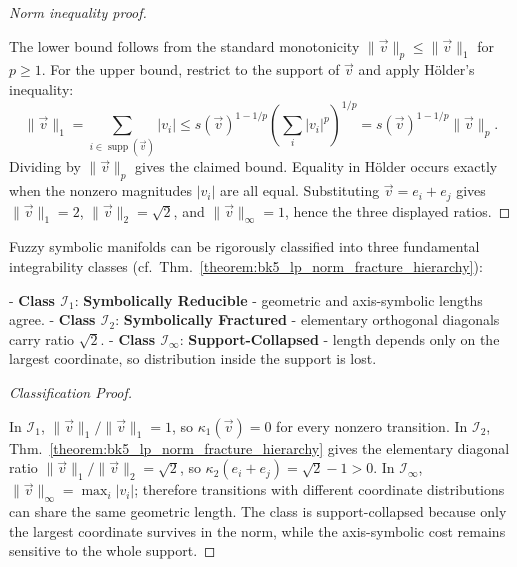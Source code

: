 \begin{proof}[Norm inequality proof]
\label{proof:bk5_lp_norm_fracture_hierarchy}
\leavevmode

The lower bound follows from the standard monotonicity
$\|\vec{v}\|_p\leq\|\vec{v}\|_1$ for $p\geq1$.  For the upper bound, restrict
to the support of $\vec{v}$ and apply Hölder's inequality:
\[
\|\vec{v}\|_1
=\sum_{i\in\operatorname{supp}(\vec{v})}|v_i|
\leq s(\vec{v})^{1-1/p}\left(\sum_i |v_i|^p\right)^{1/p}
=s(\vec{v})^{1-1/p}\|\vec{v}\|_p.
\]
Dividing by $\|\vec{v}\|_p$ gives the claimed bound.  Equality in Hölder
occurs exactly when the nonzero magnitudes $|v_i|$ are all equal.  Substituting
$\vec{v}=e_i+e_j$ gives $\|\vec{v}\|_1=2$, $\|\vec{v}\|_2=\sqrt{2}$, and
$\|\vec{v}\|_\infty=1$, hence the three displayed ratios.
\end{proof}

\begin{proposition}
\label{proposition:bk5_symbolic_integrability_classes}
Fuzzy symbolic manifolds can be rigorously classified into three fundamental integrability classes (cf.~Thm.~\ref{theorem:bk5_lp_norm_fracture_hierarchy}):

- \textbf{Class $\mathcal{I}_1$}: \textbf{Symbolically Reducible} - geometric and axis-symbolic lengths agree.
- \textbf{Class $\mathcal{I}_2$}: \textbf{Symbolically Fractured} - elementary orthogonal diagonals carry ratio $\sqrt{2}$.
- \textbf{Class $\mathcal{I}_\infty$}: \textbf{Support-Collapsed} - length depends only on the largest coordinate, so distribution inside the support is lost.
\end{proposition}

\begin{proof}[Classification Proof]
\label{proof:bk5_symbolic_integrability_classes}
\leavevmode

In $\mathcal{I}_1$, $\|\vec{v}\|_1/\|\vec{v}\|_1=1$, so
$\kappa_1(\vec{v})=0$ for every nonzero transition.  In $\mathcal{I}_2$,
Thm.~\ref{theorem:bk5_lp_norm_fracture_hierarchy} gives the elementary
diagonal ratio $\|\vec{v}\|_1/\|\vec{v}\|_2=\sqrt{2}$, so
$\kappa_2(e_i+e_j)=\sqrt{2}-1>0$.  In $\mathcal{I}_\infty$,
$\|\vec{v}\|_\infty=\max_i |v_i|$; therefore transitions with different
coordinate distributions can share the same geometric length.  The class is
support-collapsed because only the largest coordinate survives in the norm,
while the axis-symbolic cost remains sensitive to the whole support.
\end{proof}



